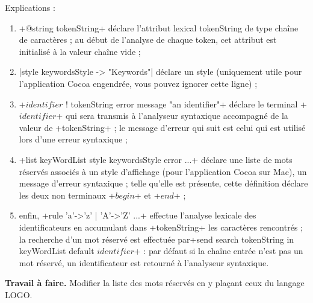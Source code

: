 
Explications :
\begin{enumerate}
  \item \ggs+@string tokenString+ déclare l’attribut lexical tokenString de type chaîne de caractères ; au début de l’analyse de chaque token, cet attribut est initialisé à la valeur chaîne vide ;
  \item \ggs|style keywordsStyle -> "Keywords"| déclare un style (uniquement utile pour l’application Cocoa engendrée, vous pouvez ignorer cette ligne) ;
  \item \ggs+$identifier$ ! tokenString error message "an identifier"+ déclare le terminal \ggs+$identifier$+ qui sera transmis à l’analyseur syntaxique accompagné de la valeur de \ggs+tokenString+ ; le message d’erreur qui suit est celui qui est utilisé lors d’une erreur syntaxique ;
  \item \ggs+list keyWordList style keywordsStyle error ...+ déclare une liste de mots réservés associés à un style d’affichage (pour l’application Cocoa sur Mac), un message d’erreur syntaxique ; telle qu’elle est présente, cette définition déclare les deux non terminaux \ggs+$begin$+ et \ggs+$end$+ ;
  \item enfin, \ggs+rule 'a'->'z' | 'A'->'Z' ...+ effectue l’analyse lexicale des identificateurs en accumulant dans \ggs+tokenString+ les caractères rencontrés ; la recherche d'un mot réservé est effectuée par\ggs+send search tokenString in keyWordList default $identifier$+ : par défaut si la chaîne entrée n'est pas un mot réservé, un identificateur est retourné à l’analyseur syntaxique.
\end{enumerate}

\textbf{Travail à faire.} Modifier la liste des mots réservés en y plaçant ceux du langage LOGO.

